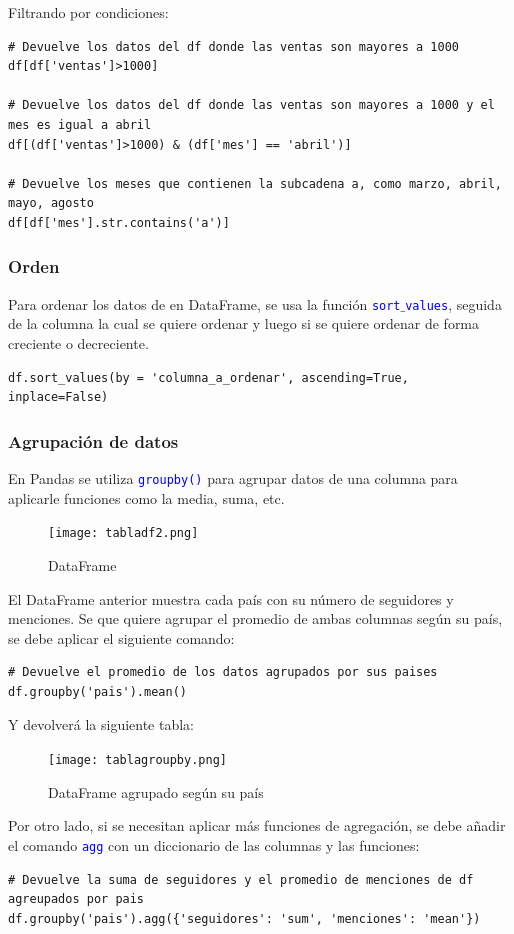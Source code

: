 \documentclass[a4paper, 12pt]{book}
\begin{document}
Filtrando por condiciones:
\begin{verbatim}
# Devuelve los datos del df donde las ventas son mayores a 1000
df[df['ventas']>1000]
	
# Devuelve los datos del df donde las ventas son mayores a 1000 y el mes es igual a abril
df[(df['ventas']>1000) & (df['mes'] == 'abril')]
	
# Devuelve los meses que contienen la subcadena a, como marzo, abril, mayo, agosto
df[df['mes'].str.contains('a')]
\end{verbatim}

\subsubsection{Orden}
Para ordenar los datos de en DataFrame, se usa la función \texttt{\textcolor{blue}{sort$\_$values}}, seguida de la columna la cual se quiere ordenar y luego si se quiere ordenar de forma creciente o decreciente.
\begin{verbatim}
df.sort_values(by = 'columna_a_ordenar', ascending=True, inplace=False)
\end{verbatim}

\subsubsection{Agrupación de datos}
En Pandas se utiliza \texttt{\textcolor{blue}{groupby()}} para agrupar datos de una columna para aplicarle funciones como la media, suma, etc.
\begin{figure}[H] 
	\centering 
	\texttt{[image: tabladf2.png]}
	\caption{DataFrame}
\end{figure}
El DataFrame anterior muestra cada país con su número de seguidores y menciones. Se que quiere agrupar el promedio de ambas columnas según su país, se debe aplicar el siguiente comando:
\begin{verbatim}
# Devuelve el promedio de los datos agrupados por sus paises
df.groupby('pais').mean()
\end{verbatim}
Y devolverá la siguiente tabla:
\begin{figure}[H] 
	\centering 
	\texttt{[image: tablagroupby.png]}
	\caption{DataFrame agrupado según su país}
\end{figure}
Por otro lado, si se necesitan aplicar más funciones de agregación, se debe añadir el comando \texttt{\textcolor{blue}{agg}} con un diccionario de las columnas y las funciones:
\begin{verbatim}
# Devuelve la suma de seguidores y el promedio de menciones de df agreupados por pais
df.groupby('pais').agg({'seguidores': 'sum', 'menciones': 'mean'})
\end{verbatim}
\end{document}
